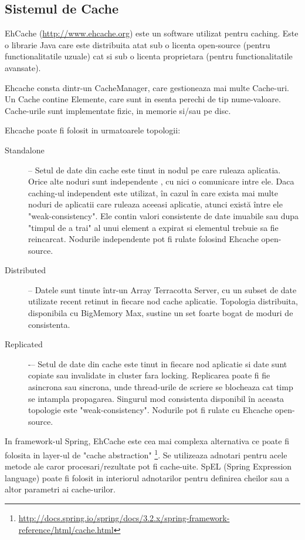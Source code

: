 \subsection{Sistemul de Cache}

EhCache (\url{http://www.ehcache.org}) este un software utilizat pentru caching. 
Este o librarie Java care este distribuita atat sub o licenta open-source (pentru functionalitatile uzuale) cat si sub o licenta proprietara (pentru functionalitatile avansate).

Ehcache consta dintr-un CacheManager, care gestioneaza mai multe Cache-uri. 
Un Cache contine Elemente, care sunt in esenta perechi de tip nume-valoare. 
Cache-urile sunt implementate fizic, in memorie si/sau pe disc.

Ehcache poate fi folosit in urmatoarele topologii:
\begin{description}
\item 
[Standalone] 
--  
Setul de date din cache este tinut in  nodul pe care ruleaza aplicatia.
Orice alte noduri sunt independente , cu nici o comunicare intre ele.
Daca caching-ul independent este utilizat, în cazul în care exista mai multe noduri de aplicatii care ruleaza aceeasi aplicatie, atunci există între ele "weak-consistency".
Ele contin valori consistente de date imuabile sau dupa "timpul de a trai" al unui element a expirat si elementul trebuie sa fie reincarcat. 
Nodurile independente pot fi rulate folosind Ehcache open-source.

\item
[Distributed]
--
Datele sunt tinute într-un Array Terracotta Server, cu un subset de date utilizate recent retinut in fiecare nod cache aplicatie. 
Topologia distribuita, disponibila cu BigMemory Max, sustine un set foarte bogat de moduri de consistenta.

\item
[Replicated]
-–
Setul de date din cache este tinut in fiecare nod aplicatie si date sunt copiate sau invalidate in cluster fara locking.
Replicarea poate fi fie asincrona sau sincrona, unde thread-urile de scriere se blocheaza cat timp se intampla propagarea.
Singurul mod consistenta disponibil în aceasta topologie este "weak-consistency". Nodurile pot fi rulate cu Ehcache open-source.
\end{description}

In framework-ul Spring, EhCache este cea mai complexa alternativa ce poate fi folosita in layer-ul de "cache abstraction" \footnote{\url{http://docs.spring.io/spring/docs/3.2.x/spring-framework-reference/html/cache.html}}.
Se utilizeaza adnotari pentru acele metode ale caror procesari/rezultate pot fi cache-uite. 
SpEL (Spring Expression language) poate fi folosit in interiorul adnotarilor pentru definirea cheilor sau a altor parametri ai cache-urilor.

